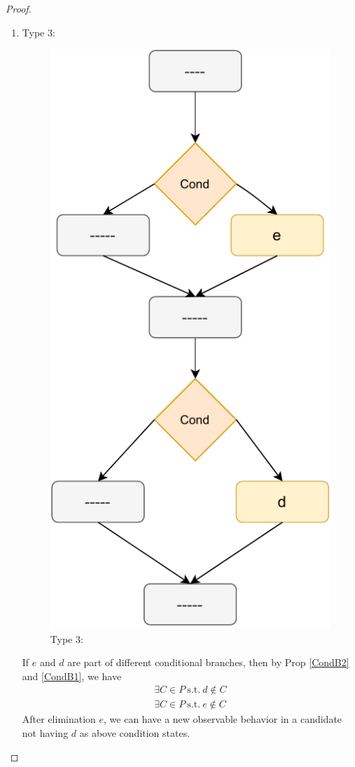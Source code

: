 \begin{proof}
\begin{itemize}
\begin{enumerate}
                        \item Type 3: 
                        
                            \begin{figure}[H]
                                \centering 
                                \includegraphics[scale=0.7]{Elimination/ConditionalsProofFig3.pdf}
                                \caption{Type 3:}    
                            \end{figure}

                            If $e$ and $d$ are part of different conditional branches, then by Prop \ref{CondB2} and \ref{CondB1}, we have 
                            \begin{align*}
                                \exists C \in P \ \text{s.t.} \ d \notin C \\ 
                                \exists C \in P \ \text{s.t.} \ e \notin C 
                            \end{align*}
                            After elimination $e$, we can have a new observable behavior in a candidate not having $d$ as above condition states. 
                        

\end{enumerate}
\end{itemize}
\end{proof}
